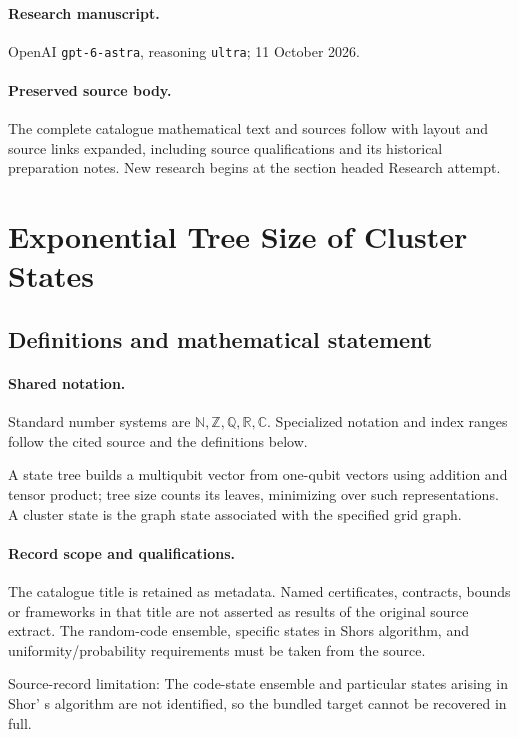 \documentclass[11pt]{article}
\begin{document}
\paragraph{Research manuscript.} OpenAI \texttt{gpt-6-astra}, reasoning \texttt{ultra}; 11 October 2026.
\paragraph{Preserved source body.} The complete catalogue mathematical text and sources follow with layout and source links expanded, including source qualifications and its historical preparation notes. New research begins at the section headed Research attempt.

\section{Exponential Tree Size of Cluster States}\label{statement}

\subsection{Definitions and mathematical statement}

\paragraph{Shared notation.}Standard number systems are $\mathbb N,\mathbb Z,\mathbb Q,\mathbb R,\mathbb C$. Specialized notation and index ranges follow the cited source and the definitions below.


A state tree builds a multiqubit vector from one-qubit vectors using addition and tensor product; tree size counts its leaves, minimizing over such representations. A cluster state is the graph state associated with the specified grid graph.
\paragraph{Record scope and qualifications.}
The catalogue title is retained as metadata. Named certificates, contracts, bounds or frameworks in that title are not asserted as results of the original source extract.
The random-code ensemble, specific states in Shor\textquotesingle s algorithm, and uniformity/probability requirements must be taken from the source.

Source-record limitation: The code-state ensemble and particular states arising in Shor' s algorithm are not identified, so the bundled target cannot be recovered in full.
\end{document}
